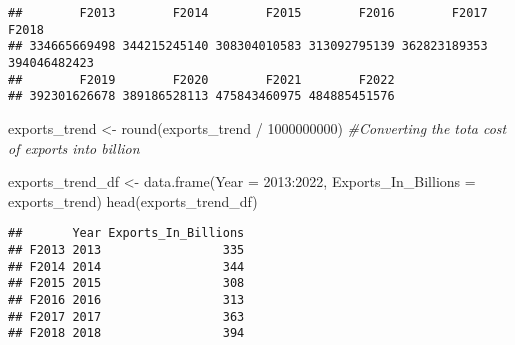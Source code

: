 \documentclass[
]{article}
\newenvironment{Shaded}{\begin{snugshade}}{\end{snugshade}}
\newcommand{\AttributeTok}[1]{\textcolor[rgb]{0.77,0.63,0.00}{#1}}
\newcommand{\CommentTok}[1]{\textcolor[rgb]{0.56,0.35,0.01}{\textit{#1}}}
\newcommand{\DecValTok}[1]{\textcolor[rgb]{0.00,0.00,0.81}{#1}}
\newcommand{\FunctionTok}[1]{\textcolor[rgb]{0.00,0.00,0.00}{#1}}
\newcommand{\NormalTok}[1]{#1}
\newcommand{\OtherTok}[1]{\textcolor[rgb]{0.56,0.35,0.01}{#1}}
\newcommand{\SpecialCharTok}[1]{\textcolor[rgb]{0.00,0.00,0.00}{#1}}
\newcommand{\StringTok}[1]{\textcolor[rgb]{0.31,0.60,0.02}{#1}}
\begin{document}
\begin{verbatim}
##        F2013        F2014        F2015        F2016        F2017        F2018 
## 334665669498 344215245140 308304010583 313092795139 362823189353 394046482423 
##        F2019        F2020        F2021        F2022 
## 392301626678 389186528113 475843460975 484885451576
\end{verbatim}

\begin{Shaded}
\begin{Highlighting}[]
\NormalTok{exports\_trend }\OtherTok{\textless{}{-}} \FunctionTok{round}\NormalTok{(exports\_trend }\SpecialCharTok{/} \DecValTok{1000000000}\NormalTok{) }\CommentTok{\#Converting the tota cost of exports into billion}
\end{Highlighting}
\end{Shaded}

\begin{Shaded}
\begin{Highlighting}[]
\NormalTok{exports\_trend\_df }\OtherTok{\textless{}{-}} \FunctionTok{data.frame}\NormalTok{(}\AttributeTok{Year =} \DecValTok{2013}\SpecialCharTok{:}\DecValTok{2022}\NormalTok{, }\StringTok{\textquotesingle{}Exports\_In\_Billions\textquotesingle{}} \OtherTok{=}\NormalTok{ exports\_trend)}
\FunctionTok{head}\NormalTok{(exports\_trend\_df)}
\end{Highlighting}
\end{Shaded}

\begin{verbatim}
##       Year Exports_In_Billions
## F2013 2013                 335
## F2014 2014                 344
## F2015 2015                 308
## F2016 2016                 313
## F2017 2017                 363
## F2018 2018                 394
\end{verbatim}
\end{document}
